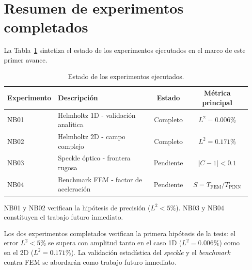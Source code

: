 \section{Resumen de experimentos completados}

La Tabla~\ref{tab:resumen_experimentos} sintetiza el estado de los experimentos
ejecutados en el marco de este primer avance.

\begin{table}[H]
\centering
\begin{threeparttable}
\caption{Estado de los experimentos ejecutados.}
\label{tab:resumen_experimentos}
\begin{tabular}{llcc}
\toprule
Experimento & Descripción & Estado & Métrica principal \\
\midrule
NB01 & Helmholtz 1D - validación analítica    & Completo  & $L^2 = 0.006\%$ \\
NB02 & Helmholtz 2D - campo complejo          & Completo  & $L^2 = 0.171\%$ \\
NB03 & Speckle óptico - frontera rugosa       & Pendiente & $|C - 1| < 0.1$ \\
NB04 & Benchmark FEM - factor de aceleración  & Pendiente & $S = T_\text{FEM}/T_\text{PINN}$ \\
\bottomrule
\end{tabular}
\begin{tablenotes}\small
    \item NB01 y NB02 verifican la hipótesis de precisión ($L^2 < 5\%$).
    NB03 y NB04 constituyen el trabajo futuro inmediato.
\end{tablenotes}
\end{threeparttable}
\end{table}



Los dos experimentos completados verifican la primera hipótesis de la tesis:
el error $L^2 < 5\%$ se supera con amplitud tanto en el caso 1D ($L^2 = 0.006\%$)
como en el 2D ($L^2 = 0.171\%$). La validación estadística del
\textit{speckle} y el \textit{benchmark} contra FEM se abordarán como
trabajo futuro inmediato.